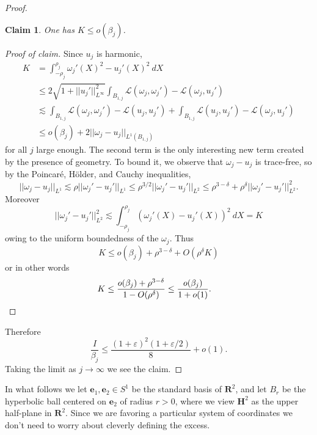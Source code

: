 \documentclass[reqno,12pt,letterpaper]{amsart}
\newcommand{\RR}{\mathbf{R}}
\newcommand{\Hyp}{\mathbf H}
\newcommand{\evect}{\mathbf e}
\newtheorem{claim}[theorem]{Claim}
\theoremstyle{definition}
\numberwithin{equation}{section}
\begin{document}
\begin{proof}
\begin{claim}
One has $K \leq o(\beta_j)$.
\end{claim}
\begin{proof}[Proof of claim]
Since $u_j$ is harmonic,
\begin{align*}
K &= \int_{-\rho_j}^{\rho_j} \omega_j'(X)^2 - u_j'(X)^2 ~dX \\
&\leq 2 \sqrt{1 + ||u_j'||_{L^\infty}^2} \int_{B_{1,j}} \mathscr L(\omega_j, \omega_j') - \mathscr L(\omega_j, u_j')\\
&\lesssim \int_{B_{1, j}} \mathscr L(\omega_j, \omega_j') - \mathscr L(u_j, u_j') + \int_{B_{1, j}} \mathscr L(u_j, u_j') - \mathscr L(\omega_j, u_j') \\
&\leq o(\beta_j) + 2||\omega_j - u_j||_{L^1(B_{1,j})}
\end{align*}
for all $j$ large enough.
The second term is the only interesting new term created by the presence of geometry.
To bound it, we observe that $\omega_j - u_j$ is trace-free, so by the Poincar\'e, H\"older, and Cauchy inequalities,
$$||\omega_j - u_j||_{L^1} \lesssim \rho ||\omega_j' - u_j'||_{L^1} \leq \rho^{3/2} ||\omega_j' - u_j'||_{L^2} \leq \rho^{3 - \delta} + \rho^\delta ||\omega_j' - u_j'||_{L^2}^2.$$
Moreover
$$||\omega_j' - u_j'||_{L^2}^2 \lesssim \int_{-\rho_j}^{\rho_j} (\omega_j'(X) - u_j'(X))^2 ~dX = K$$
owing to the uniform boundedness of the $\omega_j$.
Thus
$$K \leq o(\beta_j) + \rho^{3 - \delta} + O(\rho^\delta K)$$
or in other words
\begin{align*}
K &\leq \frac{o(\beta_j) + \rho^{3 - \delta}}{1 - O(\rho^\delta)} \leq \frac{o(\beta_j)}{1 + o(1)}. \qedhere
\end{align*}
\end{proof}

Therefore
$$\frac{I}{\beta_j} \leq \frac{(1 + \varepsilon)^2(1 + \varepsilon/2)}{8} + o(1).$$
Taking the limit as $j \to \infty$ we see the claim.
\end{proof}

In what follows we let $\evect_1, \evect_2 \in S^1$ be the standard basis of $\RR^2$, and let $B_r$ be the hyperbolic ball centered on $\evect_2$ of radius $r > 0$, where we view $\Hyp^2$ as the upper half-plane in $\RR^2$.
Since we are favoring a particular system of coordinates we don't need to worry about cleverly defining the excess.
\end{document}
